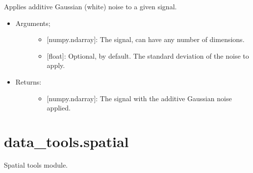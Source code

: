 \documentclass[letterpaper,10pt,english]{sphinxmanual}
\begin{document}

\begin{fulllineitems}
\label{\detokenize{signal:data_tools.signal.gauss_noise}}
Applies additive Gaussian (white) noise to a given signal.
\begin{itemize}
\item {} \begin{description}
\item[{Arguments;}] \leavevmode\begin{itemize}
\item {} 
 {[}numpy.ndarray{]}: The signal, can have any number of
dimensions.

\item {} 
 {[}float{]}: Optional,  by default. The standard
deviation of the noise to apply.

\end{itemize}

\end{description}

\item {} \begin{description}
\item[{Returns:}] \leavevmode\begin{itemize}
\item {} 
{[}numpy.ndarray{]}: The signal  with the additive Gaussian
noise applied.

\end{itemize}

\end{description}

\end{itemize}

\end{fulllineitems}

\label{\detokenize{spatial:module-data_tools.spatial}}

\section{data\_tools.spatial}
\label{\detokenize{spatial:data-tools-spatial}}\label{\detokenize{spatial::doc}}
Spatial tools module.
\end{document}
